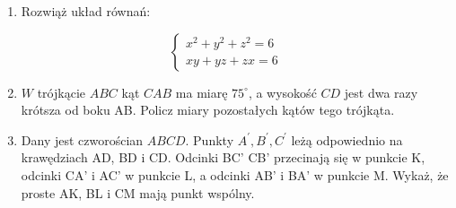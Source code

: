 \documentclass[10pt]{article}
\begin{document}
\begin{enumerate}
  \item Rozwiąż układ równań:
\end{enumerate}

\[
\left\{\begin{array}{l}
x^{2}+y^{2}+z^{2}=6 \\
x y+y z+z x=6
\end{array}\right.
\]

\begin{enumerate}
  \setcounter{enumi}{1}
  \item \(W\) trójkącie \(A B C\) kąt \(C A B\) ma miarę \(75^{\circ}\), a wysokość \(C D\) jest dwa razy krótsza od boku AB. Policz miary pozostałych kątów tego trójkąta.
  \item Dany jest czworościan \(A B C D\). Punkty \(A^{\prime}, B^{\prime}, C^{\prime}\) leżą odpowiednio na krawędziach AD, BD i CD. Odcinki BC' CB' przecinają się w punkcie K, odcinki CA' i AC' w punkcie L, a odcinki AB' i BA' w punkcie M. Wykaż, że proste AK, BL i CM mają punkt wspólny.
\end{enumerate}
\end{document}

